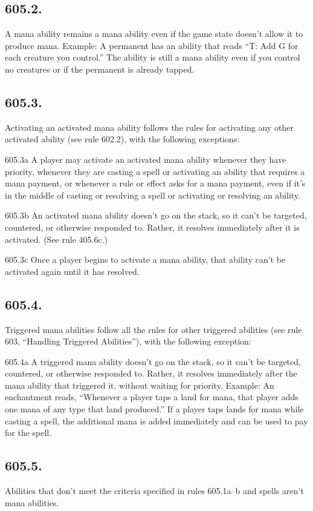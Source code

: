 \subsection*{605.2.}
A mana ability remains a mana ability even if the game state doesn’t allow it to produce mana.
Example: A permanent has an ability that reads “{T}: Add {G} for each creature you control.” The ability is still a mana ability even if you control no creatures or if the permanent is already tapped.

\subsection*{605.3.}
Activating an activated mana ability follows the rules for activating any other activated ability (see rule 602.2), with the following exceptions:

605.3a A player may activate an activated mana ability whenever they have priority, whenever they are casting a spell or activating an ability that requires a mana payment, or whenever a rule or effect asks for a mana payment, even if it’s in the middle of casting or resolving a spell or activating or resolving an ability.

605.3b An activated mana ability doesn’t go on the stack, so it can’t be targeted, countered, or otherwise responded to. Rather, it resolves immediately after it is activated. (See rule 405.6c.)

605.3c Once a player begins to activate a mana ability, that ability can’t be activated again until it has resolved.

\subsection*{605.4.}
Triggered mana abilities follow all the rules for other triggered abilities (see rule 603, “Handling Triggered Abilities”), with the following exception:

605.4a A triggered mana ability doesn’t go on the stack, so it can’t be targeted, countered, or otherwise responded to. Rather, it resolves immediately after the mana ability that triggered it, without waiting for priority.
Example: An enchantment reads, “Whenever a player taps a land for mana, that player adds one mana of any type that land produced.” If a player taps lands for mana while casting a spell, the additional mana is added immediately and can be used to pay for the spell.

\subsection*{605.5.}
Abilities that don’t meet the criteria specified in rules 605.1a–b and spells aren’t mana abilities.


